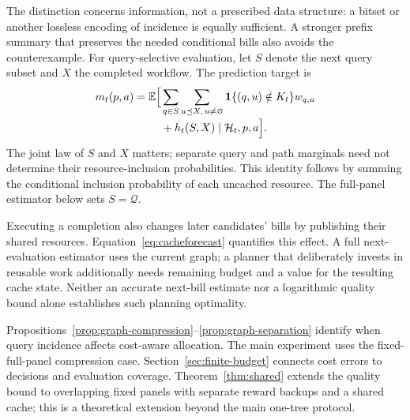 The distinction concerns information, not a prescribed data structure: a bitset or another lossless encoding of incidence is equally sufficient. A stronger prefix summary that preserves the needed conditional bills also avoids the counterexample. For query-selective evaluation, let $S$ denote the next query subset and $X$ the completed workflow. The prediction target is
\begin{equation}
 \begin{split}
 m_t(p,a)=\mathbb E\Bigl[
   &\sum_{q\in S}\sum_{u\preceq X,\,u\ne\varnothing}
       \mathbf{1}\{(q,u)\notin K_t\}w_{q,u}\\[-2pt]
   &+h_t(S,X)\mid\mathcal H_t,p,a\Bigr].
 \end{split}
 \label{eq:joint-panel-cost}
\end{equation}
The joint law of $S$ and $X$ matters; separate query and path marginals need not determine their resource-inclusion probabilities. This identity follows by summing the conditional inclusion probability of each uncached resource. The full-panel estimator below sets $S=\mathcal Q$.

Executing a completion also changes later candidates' bills by publishing their shared resources. Equation~\eqref{eq:cacheforecast} quantifies this effect. A full next-evaluation estimator uses the current graph; a planner that deliberately invests in reusable work additionally needs remaining budget and a value for the resulting cache state. Neither an accurate next-bill estimate nor a logarithmic quality bound alone establishes such planning optimality.

Propositions~\ref{prop:graph-compression}--\ref{prop:graph-separation} identify when query incidence affects cost-aware allocation. The main experiment uses the fixed-full-panel compression case. Section~\ref{sec:finite-budget} connects cost errors to decisions and evaluation coverage. Theorem~\ref{thm:shared} extends the quality bound to overlapping fixed panels with separate reward backups and a shared cache; this is a theoretical extension beyond the main one-tree protocol.
